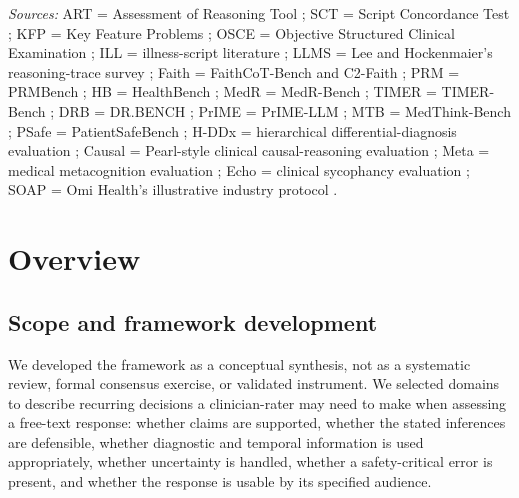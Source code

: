 \documentclass{article}
\begin{document}
\begin{table}[htbp]
\begin{threeparttable}
\begin{tablenotes}[flushleft]
\item[]
\textit{Sources:}
ART = Assessment of Reasoning Tool
\cite{thammasitboon2018art,cook2021artvalidation};
SCT = Script Concordance Test
\cite{lubarsky2011sct,fournier2008sct,lubarsky2013};
KFP = Key Feature Problems \cite{page1995kfp};
OSCE = Objective Structured Clinical Examination \cite{harden1975osce};
ILL = illness-script literature
\cite{si2022illnessscripts,jagannath2019illnessscripts};
LLMS = Lee and Hockenmaier's reasoning-trace survey \cite{lee2025survey};
Faith = FaithCoT-Bench and C2-Faith
\cite{shen2025faithcotbench,mittal2026c2faith};
PRM = PRMBench \cite{song2025prmbench};
HB = HealthBench \cite{arora2025healthbench};
MedR = MedR-Bench \cite{qiu2025medrbench};
TIMER = TIMER-Bench \cite{cui2025timer};
DRB = DR.BENCH \cite{gao2023drbench};
PrIME = PrIME-LLM \cite{rao2026clinicalreasoning};
MTB = MedThink-Bench \cite{zhou2026medthinkbench};
PSafe = PatientSafeBench \cite{kim2025patientsafebench};
H-DDx = hierarchical differential-diagnosis evaluation \cite{lim2025hddx};
Causal = Pearl-style clinical causal-reasoning evaluation
\cite{bhasuran2025causal};
Meta = medical metacognition evaluation \cite{griot2025metacognition};
Echo = clinical sycophancy evaluation
\cite{bedi2025echobench,wang2025falsevalidation};
SOAP = Omi Health's illustrative industry protocol
\cite{omihealth2026soap}.

\end{tablenotes}
\end{threeparttable}
\end{table}

\section{Overview}

\subsection*{Scope and framework development}

We developed the framework as a conceptual synthesis, not as a
systematic review, formal consensus exercise, or validated instrument.
We selected domains to describe recurring decisions a clinician-rater
may need to make when assessing a free-text response: whether claims
are supported, whether the stated inferences are defensible, whether
diagnostic and temporal information is used appropriately, whether
uncertainty is handled, whether a safety-critical error is present,
and whether the response is usable by its specified audience.
\end{document}
